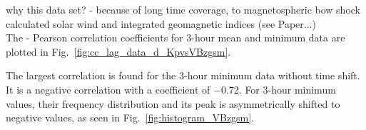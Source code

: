why this data set? - because of long time coverage, to magnetospheric bow shock calculated solar wind and integrated geomagnetic indices (see Paper...)\\

The \Kp{}-\vBz{} Pearson correlation coefficients for 3-hour mean and minimum data are plotted in Fig.~\ref{fig:cc_lag_data_d_KpvsVBzgsm}.
\begin{figure}
\end{figure}
The largest correlation is found for the 3-hour minimum data without time shift. It is a negative correlation with a coefficient of $-0.72$. For \vBz{} 3-hour minimum values, their frequency distribution and its peak is asymmetrically shifted to negative values, as seen in Fig.~\ref{fig:histogram_VBzgsm}.
\begin{figure}
\end{figure}


